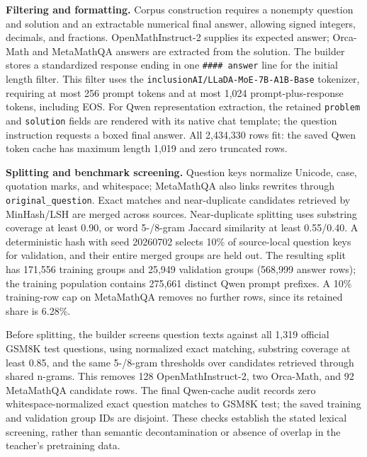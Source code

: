 \documentclass{article}
\begin{document}
\textbf{Filtering and formatting.} Corpus construction requires a nonempty question and solution and an extractable numerical final answer, allowing signed integers, decimals, and fractions. OpenMathInstruct-2 supplies its expected answer; Orca-Math and MetaMathQA answers are extracted from the solution. The builder stores a standardized response ending in one \texttt{\#\#\#\# answer} line for the initial length filter. This filter uses the \texttt{inclusionAI/LLaDA-MoE-7B-A1B-Base} tokenizer, requiring at most 256 prompt tokens and at most 1,024 prompt-plus-response tokens, including EOS. For Qwen representation extraction, the retained \texttt{problem} and \texttt{solution} fields are rendered with its native chat template; the question instruction requests a boxed final answer. All 2,434,330 rows fit: the saved Qwen token cache has maximum length 1,019 and zero truncated rows.

\textbf{Splitting and benchmark screening.} Question keys normalize Unicode, case, quotation marks, and whitespace; MetaMathQA also links rewrites through \texttt{original\_question}. Exact matches and near-duplicate candidates retrieved by MinHash/LSH are merged across sources. Near-duplicate splitting uses substring coverage at least 0.90, or word 5-/8-gram Jaccard similarity at least 0.55/0.40. A deterministic hash with seed 20260702 selects 10\% of source-local question keys for validation, and their entire merged groups are held out. The resulting split has 171,556 training groups and 25,949 validation groups (568,999 answer rows); the training population contains 275,661 distinct Qwen prompt prefixes. A 10\% training-row cap on MetaMathQA removes no further rows, since its retained share is 6.28\%.

Before splitting, the builder screens question texts against all 1,319 official GSM8K test questions, using normalized exact matching, substring coverage at least 0.85, and the same 5-/8-gram thresholds over candidates retrieved through shared n-grams. This removes 128 OpenMathInstruct-2, two Orca-Math, and 92 MetaMathQA candidate rows. The final Qwen-cache audit records zero whitespace-normalized exact question matches to GSM8K test; the saved training and validation group IDs are disjoint. These checks establish the stated lexical screening, rather than semantic decontamination or absence of overlap in the teacher's pretraining data.
\end{document}
